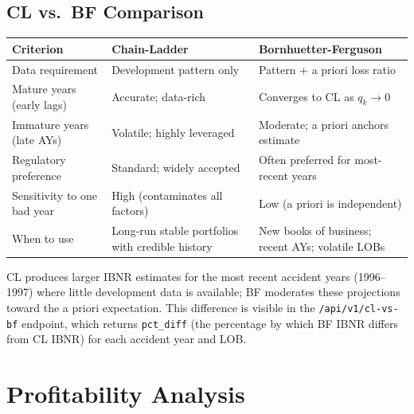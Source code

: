\subsection{CL vs.\ BF Comparison}

\begin{center}
\begin{tabular}{p{4cm} p{5cm} p{5cm}}
\toprule
\textbf{Criterion} & \textbf{Chain-Ladder} & \textbf{Bornhuetter-Ferguson} \\
\midrule
Data requirement
  & Development pattern only
  & Pattern + a priori loss ratio \\
Mature years (early lags)
  & Accurate; data-rich
  & Converges to CL as $q_k \to 0$ \\
Immature years (late AYs)
  & Volatile; highly leveraged
  & Moderate; a priori anchors estimate \\
Regulatory preference
  & Standard; widely accepted
  & Often preferred for most-recent years \\
Sensitivity to one bad year
  & High (contaminates all factors)
  & Low (a priori is independent) \\
When to use
  & Long-run stable portfolios with credible history
  & New books of business; recent AYs; volatile LOBs \\
\bottomrule
\end{tabular}
\end{center}

\begin{keyinsight}
CL produces larger IBNR estimates for the most recent accident years
(1996--1997) where little development data is available; BF moderates these
projections toward the a priori expectation.  This difference is visible in
the \texttt{/api/v1/cl-vs-bf} endpoint, which returns \texttt{pct\_diff}
(the percentage by which BF IBNR differs from CL IBNR) for each accident year
and LOB.
\end{keyinsight}

\section{Profitability Analysis}
\label{sec:ins-profitability}


